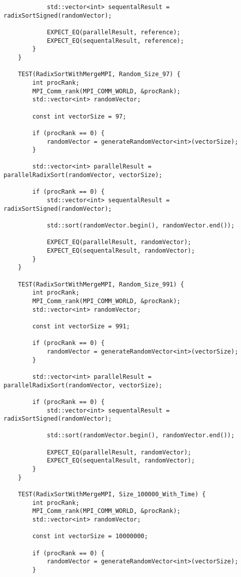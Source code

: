 \documentclass{report}
\begin{document}
\begin{lstlisting}
            std::vector<int> sequentalResult = radixSortSigned(randomVector);
    
            EXPECT_EQ(parallelResult, reference);
            EXPECT_EQ(sequentalResult, reference);
        }
    }
    
    TEST(RadixSortWithMergeMPI, Random_Size_97) {
        int procRank;
        MPI_Comm_rank(MPI_COMM_WORLD, &procRank);
        std::vector<int> randomVector;
    
        const int vectorSize = 97;
    
        if (procRank == 0) {
            randomVector = generateRandomVector<int>(vectorSize);
        }
    
        std::vector<int> parallelResult = parallelRadixSort(randomVector, vectorSize);
    
        if (procRank == 0) {
            std::vector<int> sequentalResult = radixSortSigned(randomVector);
    
            std::sort(randomVector.begin(), randomVector.end());
    
            EXPECT_EQ(parallelResult, randomVector);
            EXPECT_EQ(sequentalResult, randomVector);
        }
    }
    
    TEST(RadixSortWithMergeMPI, Random_Size_991) {
        int procRank;
        MPI_Comm_rank(MPI_COMM_WORLD, &procRank);
        std::vector<int> randomVector;
    
        const int vectorSize = 991;
    
        if (procRank == 0) {
            randomVector = generateRandomVector<int>(vectorSize);
        }
    
        std::vector<int> parallelResult = parallelRadixSort(randomVector, vectorSize);
    
        if (procRank == 0) {
            std::vector<int> sequentalResult = radixSortSigned(randomVector);
    
            std::sort(randomVector.begin(), randomVector.end());
    
            EXPECT_EQ(parallelResult, randomVector);
            EXPECT_EQ(sequentalResult, randomVector);
        }
    }
    
    TEST(RadixSortWithMergeMPI, Size_100000_With_Time) {
        int procRank;
        MPI_Comm_rank(MPI_COMM_WORLD, &procRank);
        std::vector<int> randomVector;
    
        const int vectorSize = 10000000;
    
        if (procRank == 0) {
            randomVector = generateRandomVector<int>(vectorSize);
        }
    

\end{lstlisting}
\end{document}
